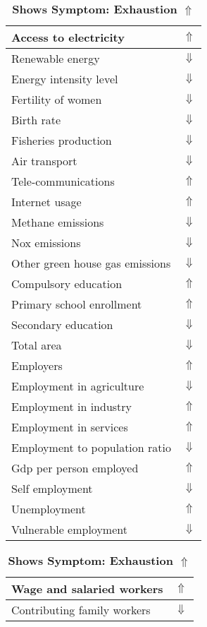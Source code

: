 \documentclass[12pt,notitlepage,oneside]{report}
\begin{document}
\begin{table}[!htb]
\caption{\textbf{Shows Symptom: Exhaustion $\Uparrow$}}
\centering
\label{Correlated Socio-economic Factors0}
\begin{tabular}{|l|l|}
\hline
Access to electricity & $\Uparrow$\\ \hline
Renewable energy & $\Downarrow$\\ \hline
Energy intensity level & $\Downarrow$\\ \hline
Fertility of women & $\Downarrow$\\ \hline
Birth rate & $\Downarrow$\\ \hline
Fisheries production & $\Downarrow$\\ \hline
Air transport  & $\Downarrow$\\ \hline
Tele-communications & $\Uparrow$\\ \hline
Internet usage & $\Uparrow$\\ \hline
Methane emissions & $\Downarrow$\\ \hline
Nox emissions & $\Downarrow$\\ \hline
Other green house gas emissions & $\Downarrow$\\ \hline
Compulsory education & $\Uparrow$\\ \hline
Primary school enrollment & $\Uparrow$\\ \hline
Secondary education & $\Downarrow$\\ \hline
Total area & $\Downarrow$\\ \hline
Employers & $\Uparrow$\\ \hline
Employment in agriculture & $\Downarrow$\\ \hline
Employment in industry & $\Uparrow$\\ \hline
Employment in services & $\Uparrow$\\ \hline
Employment to population ratio & $\Downarrow$\\ \hline
Gdp per person employed & $\Uparrow$\\ \hline
Self employment & $\Downarrow$\\ \hline
Unemployment & $\Uparrow$\\ \hline
Vulnerable employment & $\Downarrow$\\ \hline
\end{tabular}
\begin{tabular}{|l|l|}
\hline
Wage and salaried workers & $\Uparrow$\\ \hline
Contributing family workers & $\Downarrow$\\ \hline

\end{tabular}
\end{table}
\end{document}
